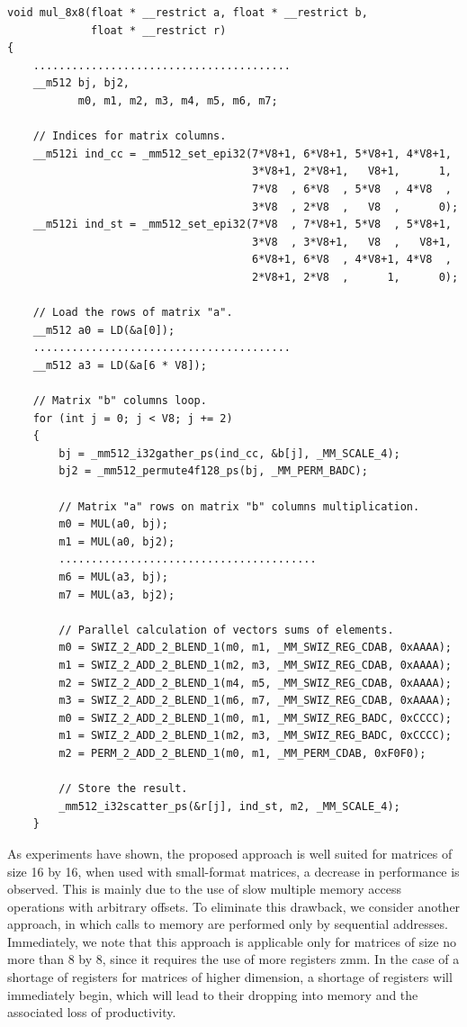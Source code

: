 \documentclass[
11pt,%
tightenlines,%
twoside,%
onecolumn,%
nofloats,%
nobibnotes,%
nofootinbib,%
superscriptaddress,%
noshowpacs,%
centertags]%
{revtex4}
\begin{document}
\begin{lstlisting}
void mul_8x8(float * __restrict a, float * __restrict b,
             float * __restrict r)
{
    ........................................
    __m512 bj, bj2,
           m0, m1, m2, m3, m4, m5, m6, m7;

    // Indices for matrix columns.
    __m512i ind_cc = _mm512_set_epi32(7*V8+1, 6*V8+1, 5*V8+1, 4*V8+1,
                                      3*V8+1, 2*V8+1,   V8+1,      1,
                                      7*V8  , 6*V8  , 5*V8  , 4*V8  ,
                                      3*V8  , 2*V8  ,   V8  ,      0);
    __m512i ind_st = _mm512_set_epi32(7*V8  , 7*V8+1, 5*V8  , 5*V8+1,
                                      3*V8  , 3*V8+1,   V8  ,   V8+1,
                                      6*V8+1, 6*V8  , 4*V8+1, 4*V8  ,
                                      2*V8+1, 2*V8  ,      1,      0);

    // Load the rows of matrix "a".
    __m512 a0 = LD(&a[0]);
    ........................................
    __m512 a3 = LD(&a[6 * V8]);

    // Matrix "b" columns loop.
    for (int j = 0; j < V8; j += 2)
    {
        bj = _mm512_i32gather_ps(ind_cc, &b[j], _MM_SCALE_4);
        bj2 = _mm512_permute4f128_ps(bj, _MM_PERM_BADC);

        // Matrix "a" rows on matrix "b" columns multiplication.
        m0 = MUL(a0, bj);
        m1 = MUL(a0, bj2);
        ........................................
        m6 = MUL(a3, bj);
        m7 = MUL(a3, bj2);

        // Parallel calculation of vectors sums of elements.
        m0 = SWIZ_2_ADD_2_BLEND_1(m0, m1, _MM_SWIZ_REG_CDAB, 0xAAAA);
        m1 = SWIZ_2_ADD_2_BLEND_1(m2, m3, _MM_SWIZ_REG_CDAB, 0xAAAA);
        m2 = SWIZ_2_ADD_2_BLEND_1(m4, m5, _MM_SWIZ_REG_CDAB, 0xAAAA);
        m3 = SWIZ_2_ADD_2_BLEND_1(m6, m7, _MM_SWIZ_REG_CDAB, 0xAAAA);
        m0 = SWIZ_2_ADD_2_BLEND_1(m0, m1, _MM_SWIZ_REG_BADC, 0xCCCC);
        m1 = SWIZ_2_ADD_2_BLEND_1(m2, m3, _MM_SWIZ_REG_BADC, 0xCCCC);
        m2 = PERM_2_ADD_2_BLEND_1(m0, m1, _MM_PERM_CDAB, 0xF0F0);

        // Store the result.
        _mm512_i32scatter_ps(&r[j], ind_st, m2, _MM_SCALE_4);
    }
\end{lstlisting}

As experiments have shown, the proposed approach is well suited for matrices of size 16 by 16, when used with small-format matrices, a decrease in performance is observed. This is mainly due to the use of slow multiple memory access operations with arbitrary offsets. To eliminate this drawback, we consider another approach, in which calls to memory are performed only by sequential addresses. Immediately, we note that this approach is applicable only for matrices of size no more than 8 by 8, since it requires the use of more registers zmm. In the case of a shortage of registers for matrices of higher dimension, a shortage of registers will immediately begin, which will lead to their dropping into memory and the associated loss of productivity.
\end{document}
